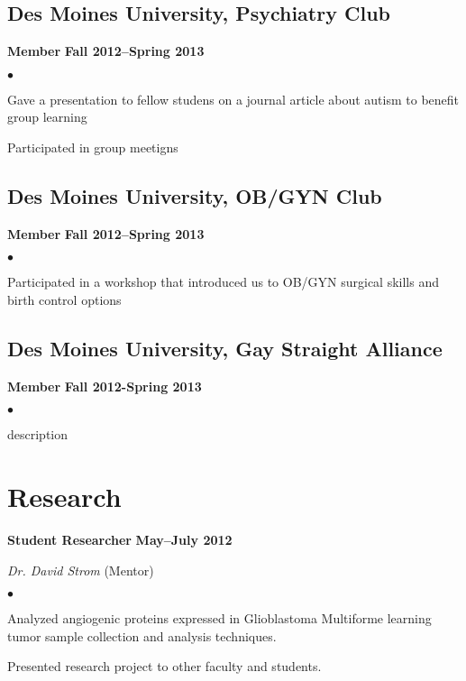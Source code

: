 \documentclass[10pt,letterpaper]{article}
\renewenvironment{itemize}{
  \begin{list}{}{
      \setlength{\leftmargin}{1.5em}
      \setlength{\itemsep}{0.25em}
      \setlength{\parskip}{0pt}
      \setlength{\parsep}{0.25em}
    }
  }{
  \end{list}
}
\newenvironment{bitemize}{
  \begin{list}{$\bullet$}{
      \setlength{\leftmargin}{1.5em}
      \setlength{\itemsep}{0.25em}
      \setlength{\parskip}{0pt}
      \setlength{\parsep}{0.25em}
    }
  }{
  \end{list}
}
\newcommand{\yearrange}[1]{\hfill \textbf{#1} \par}
\begin{document}
\subsection*{Des Moines University, Psychiatry Club}
\begin{itemize}
\item \textbf{Member} \yearrange{Fall 2012--Spring 2013}
  \begin{bitemize}
  \item Gave a presentation to fellow studens on a journal article about autism to benefit group learning
  \item Participated in group meetigns
   \end{bitemize}
\end{itemize}

\subsection*{Des Moines University, OB/GYN Club}
\begin{itemize}
\item \textbf{Member} \yearrange{Fall 2012--Spring 2013}
  \begin{bitemize}
  \item Participated in a workshop that introduced us to OB/GYN surgical
  skills and birth control options
    \end{bitemize}
\end{itemize}

\subsection*{Des Moines University, Gay Straight Alliance}
\begin{itemize}
\item \textbf{Member} \yearrange{Fall 2012-Spring 2013}
  \begin{bitemize}
  \item description
  \end{bitemize}
\end{itemize}


\section*{Research}

\begin{itemize}
\item \textbf{Student Researcher} \yearrange{May--July 2012}
  \textit{Dr. David Strom} (Mentor)
  \begin{bitemize}
  \item Analyzed angiogenic proteins expressed in Glioblastoma
    Multiforme learning tumor sample collection and analysis
    techniques. 
  \item Presented research project to other faculty and students.
  \end{bitemize}
\end{itemize}
\end{document}
